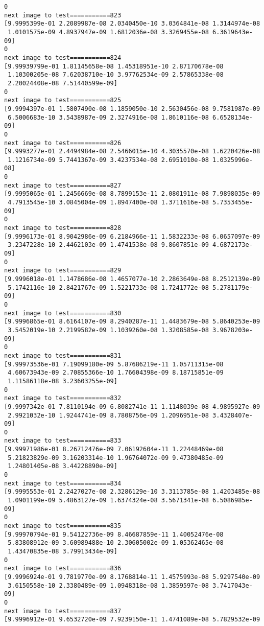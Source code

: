 \documentclass[11pt]{article}
\begin{document}
\begin{Verbatim}[commandchars=\\\{\}]
0
next image to test===========823
[9.9995399e-01 2.2089987e-08 2.0340450e-10 3.0364841e-08 1.3144974e-08
 1.0101575e-09 4.8937947e-09 1.6812036e-08 3.3269455e-08 6.3619643e-09]
0
next image to test===========824
[9.99939799e-01 1.81145658e-08 1.45318951e-10 2.87170678e-08
 1.10300205e-08 7.62038710e-10 3.97762534e-09 2.57865338e-08
 2.20024408e-08 7.51440599e-09]
0
next image to test===========825
[9.9994397e-01 1.5807490e-08 1.1859050e-10 2.5630456e-08 9.7581987e-09
 6.5006683e-10 3.5438987e-09 2.3274916e-08 1.8610116e-08 6.6528134e-09]
0
next image to test===========826
[9.9993277e-01 2.4494984e-08 2.5466015e-10 4.3035570e-08 1.6220426e-08
 1.1216734e-09 5.7441367e-09 3.4237534e-08 2.6951010e-08 1.0325996e-08]
0
next image to test===========827
[9.9995065e-01 1.2456669e-08 8.7899153e-11 2.0801911e-08 7.9898035e-09
 4.7913545e-10 3.0845004e-09 1.8947400e-08 1.3711616e-08 5.7353455e-09]
0
next image to test===========828
[9.9996173e-01 8.9042986e-09 6.2184966e-11 1.5832233e-08 6.0657097e-09
 3.2347228e-10 2.4462103e-09 1.4741538e-08 9.8607851e-09 4.6872173e-09]
0
next image to test===========829
[9.9996018e-01 1.1478686e-08 1.4657077e-10 2.2863649e-08 8.2512139e-09
 5.1742116e-10 2.8421767e-09 1.5221733e-08 1.7241772e-08 5.2781179e-09]
0
next image to test===========830
[9.9996865e-01 8.6164107e-09 8.2940287e-11 1.4483679e-08 5.8640253e-09
 3.5452019e-10 2.2199582e-09 1.1039260e-08 1.3208585e-08 3.9678203e-09]
0
next image to test===========831
[9.99973536e-01 7.19099180e-09 5.87686219e-11 1.05711315e-08
 4.60673943e-09 2.70855366e-10 1.76604398e-09 8.18715851e-09
 1.11586118e-08 3.23603255e-09]
0
next image to test===========832
[9.9997342e-01 7.8110194e-09 6.8082741e-11 1.1148039e-08 4.9895927e-09
 2.9921032e-10 1.9244741e-09 8.7808756e-09 1.2096951e-08 3.4328407e-09]
0
next image to test===========833
[9.99971986e-01 8.26712476e-09 7.06192604e-11 1.22448469e-08
 5.21823829e-09 3.16203314e-10 1.96764072e-09 9.47380485e-09
 1.24801405e-08 3.44228890e-09]
0
next image to test===========834
[9.9995553e-01 2.2427027e-08 2.3286129e-10 3.3113785e-08 1.4203485e-08
 1.0901199e-09 5.4863127e-09 1.6374324e-08 3.5671341e-08 6.5086985e-09]
0
next image to test===========835
[9.99970794e-01 9.54122736e-09 8.46687859e-11 1.40052476e-08
 5.83808912e-09 3.60989488e-10 2.30605002e-09 1.05362465e-08
 1.43470835e-08 3.79913434e-09]
0
next image to test===========836
[9.9996924e-01 9.7819770e-09 8.1768814e-11 1.4575993e-08 5.9297540e-09
 3.6150558e-10 2.3380489e-09 1.0948318e-08 1.3859597e-08 3.7417043e-09]
0
next image to test===========837
[9.9996912e-01 9.6532720e-09 7.9239150e-11 1.4741089e-08 5.7829532e-09

\end{Verbatim}
\end{document}
